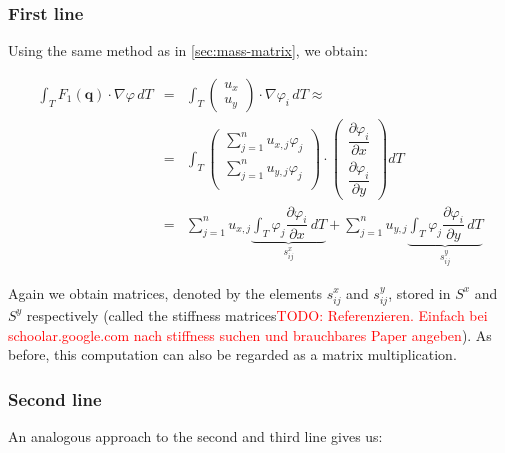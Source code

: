 \documentclass{article}
\newcommand{\todo}[2][]{\textcolor{red}{TODO\ifthenelse{\equal{#1}{}}{}{[#1]}: #2}}
\newcommand{\pd}[2]{\dfrac{\partial #1}{\partial #2}}
\renewcommand{\phi}{\varphi}
\begin{document}
\subsubsection{First line}
\label{sec:stiffness-matrix-first-line}

Using the same method as in \ref{sec:mass-matrix}, we obtain:

\begin{eqnarray*}
  \int_T F_1(\mathbf{q}) \cdot \nabla \phi \, dT & = &
  \int_T
  \begin{pmatrix}
    u_x \\ u_y
  \end{pmatrix}
  \cdot \nabla \phi_i \, dT \approx \\
  &=& \int_T
  \begin{pmatrix}
    \sum_{j=1}^n u_{x,j} \phi_j \\
    \sum_{j=1}^n u_{y,j} \phi_j \\
  \end{pmatrix}
  \cdot
  \begin{pmatrix}
    \pd{\phi_i}{x} \\
    \pd{\phi_i}{y}
  \end{pmatrix} dT \\
  & = & \sum_{j=1}^n u_{x,j} \underbrace{\int_T \phi_j \pd{\phi_i}{x} \, dT}_{s_{ij}^x} + \sum_{j=1}^n u_{y,j} \underbrace{\int_T \phi_j \pd{\phi_i}{y} \, dT}_{s_{ij}^y}
\end{eqnarray*}

Again we obtain matrices, denoted by the elements $s_{ij}^x$ and $s_{ij}^y$, stored in $S^x$ and $S^y$ respectively (called the stiffness matrices\todo{Referenzieren. Einfach bei schoolar.google.com nach stiffness suchen und brauchbares Paper angeben}). As before, this computation can also be regarded as a matrix multiplication.

\subsubsection{Second line}
\label{sec:stiffness-second-line}

An analogous approach to the second and third line gives us:
\end{document}
